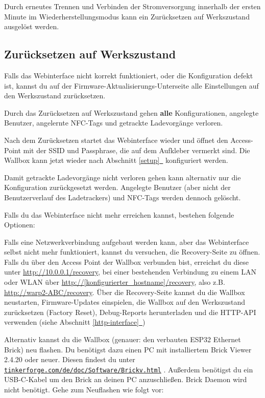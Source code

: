 \documentclass[a4paper,10pt]{article}
\newcommand{\hint}[1]{\begin{tcolorbox}[colback=boxgray,colframe=black,coltext=
white,title=Hinweis,left*=2mm,right*=2mm,boxsep=1mm,bottom=1mm,top=1mm]#1\end{tcolorbox}}
\newcommand*{\fullref}[1]{Abschnitt \hyperref[{#1}]{\ref*{#1}~\nameref*{#1}}}
\newcommand\rurl[2]{%
  \href{#1}{\nolinkurl{#2}}%
}
\begin{document}
\begin{multicols*}{2}
    Durch erneutes Trennen und Verbinden der Stromversorgung innerhalb der ersten Minute im Wiederherstellungsmodus kann ein Zurücksetzen auf Werkszustand ausgelöst werden.

    \subsection{Zurücksetzen auf Werkszustand}\label{reset}
    Falls das Webinterface nicht korrekt funktioniert, oder die Konfiguration defekt ist,
    kannst du auf der Firmware-Aktualisierungs-Unterseite alle Einstellungen auf den Werkszustand zurücksetzen.
    \hint{Durch das Zurücksetzen auf Werkszustand gehen \mbox{\textbf{alle}} Konfigurationen, angelegte Benutzer, angelernte NFC-Tags und getrackte Ladevorgänge verloren.}
    Nach dem Zurücksetzen startet das Webinterface wieder und öffnet
    den Access-Point mit der SSID und Passphrase, die auf dem Aufkleber vermerkt
    sind. Die Wallbox kann jetzt wieder nach \fullref{setup} konfiguriert werden.

    Damit getrackte Ladevorgänge nicht verloren gehen kann alternativ nur die Konfiguration zurückgesetzt werden.
    Angelegte Benutzer (aber nicht der Benutzerverlauf des Ladetrackers) und NFC-Tags werden dennoch gelöscht.

    Falls du das Webinterface nicht mehr erreichen kannst, bestehen folgende Optionen:

    Falls eine Netzwerkverbindung aufgebaut werden kann, aber das Webinterface selbst nicht mehr funktioniert, kannst du versuchen, die Recovery-Seite zu öffnen.
    Falls du über den Access Point der Wallbox verbunden bist, erreichst du diese unter \url{http://10.0.0.1/recovery},
    bei einer bestehenden Verbindung zu einem LAN oder WLAN über \url{http://[konfigurierter_hostname]/recovery}, also z.B. \url{http://warp2-ABC/recovery}.
    Über die Recovery-Seite kannst du die Wallbox neustarten, Firmware-Updates einspielen,
    die Wallbox auf den Werkszustand zurücksetzen (Factory Reset), Debug-Reports
    herunterladen und die HTTP-API verwenden (siehe \fullref{http-interface})

    Alternativ kannst du die Wallbox (genauer: den verbauten ESP32 Ethernet
    Brick) neu flashen.
    Du benötigst dazu einen PC mit installiertem Brick Viewer 2.4.20 oder neuer. Diesen findest du unter
    \rurl{https://www.tinkerforge.com/de/doc/Software/Brickv.html}{tinkerforge.com/de/doc/Software/Brickv.html}.
    Außerdem benötigst du ein USB-C-Kabel um den Brick an deinen PC anzuschließen. Brick Daemon wird nicht benötigt.
    Gehe zum Neuflashen wie folgt vor:



\end{multicols*}
\end{document}
